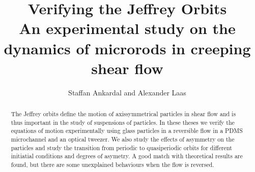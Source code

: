 \documentclass[notitlepage]{report}
\title{Verifying the Jeffrey Orbits \\
		\Large{An experimental study on the dynamics of microrods in creeping shear flow}}
\author{Staffan Ankardal and Alexander Laas}
\begin{document}
\maketitle

\begin{abstract}
The Jeffrey orbits define the motion of axissymmetrical particles in shear flow and is thus important in the study of suspensions of particles. In these theses we verify the equations of motion experimentally using glass particles in a reversible flow in a PDMS microchannel and an optical tweezer. We also study the effects of asymmetry on the particles and study the transition from periodic to quasiperiodic orbits for different initiatial conditions and degrees of asymetry. A good match with theoretical results are found, but there are some unexplained behaviours when the  flow is reversed.
\end{abstract}
\end{document}
